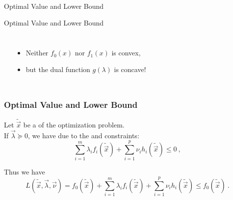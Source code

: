 \begin{frame}{Optimal Value and Lower Bound \cont}
  
  \begin{center}
  \end{center}
\end{frame}  


\begin{frame}{Optimal Value and Lower Bound \cont}

  \begin{columns}
      \begin{center}
        \resizebox{\linewidth}{!}{
          
        }
      \end{center}
      \vspace{.3cm}
      \begin{itemize}
        \item Neither $f_0(x)$ nor $f_1(x)$ is convex,
        \item but the dual function $g(\lambda)$ is concave!
      \end{itemize}
  \end{columns}
\end{frame}


\begin{frame}
  \frametitle{Optimal Value and Lower Bound \cont}

  Let $\tilde{\vec{x}}$ be a  of the optimization problem. \\[.3cm]
  If $\vec{\lambda}\succeq 0$, we have due to the  and  constraints:
  \begin{displaymath}
    \sum_{i=1}^m \lambda_i f_i(\tilde{\vec{x}}) + 
    \sum_{i=1}^p\nu_i h_i(\tilde{\vec{x}}) 
    \leq 0~,
  \end{displaymath}
  \pause

  Thus we have
  \begin{displaymath}
    L(\tilde{\vec{x}},\vec{\lambda},\vec{\nu}) =
    f_0 ({\tilde{\vec{x}}}) + 
    \sum_{i=1}^m\lambda_i f_i(\tilde{\vec{x}}) + 
    \sum_{i=1}^p\nu_i h_i(\tilde{\vec{x}}) 
    \leq f_0 ({\tilde{\vec{x}}})~.
  \end{displaymath}
\end{frame}
  
